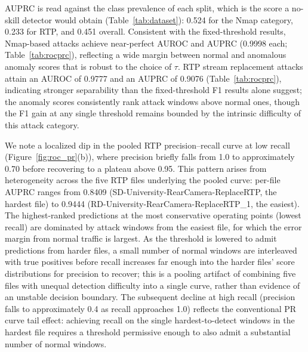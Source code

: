 AUPRC is read against the class prevalence of each split, which is the score a no-skill detector would obtain (Table~\ref{tab:dataset}): 0.524 for the Nmap category, 0.233 for RTP, and 0.451 overall. Consistent with the fixed-threshold results, Nmap-based attacks achieve near-perfect AUROC and AUPRC (0.9998 each; Table~\ref{tab:rocprc}), reflecting a wide margin between normal and anomalous anomaly scores that is robust to the choice of $\tau$. RTP stream replacement attacks attain an AUROC of 0.9777 and an AUPRC of 0.9076 (Table~\ref{tab:rocprc}), indicating stronger separability than the fixed-threshold F1 results alone suggest; the anomaly scores consistently rank attack windows above normal ones, though the F1 gain at any single threshold remains bounded by the intrinsic difficulty of this attack category.

We note a localized dip in the pooled RTP precision--recall curve at low recall (Figure~\ref{fig:roc_pr}(b)), where precision briefly falls from 1.0 to approximately 0.70 before recovering to a plateau above 0.95. This pattern arises from heterogeneity across the five RTP files underlying the pooled curve: per-file AUPRC ranges from 0.8409 (SD-University-RearCamera-ReplaceRTP, the hardest file) to 0.9444 (RD-University-RearCamera-ReplaceRTP\_1, the easiest). The highest-ranked predictions at the most conservative operating points (lowest recall) are dominated by attack windows from the easiest file, for which the error margin from normal traffic is largest. As the threshold is lowered to admit predictions from harder files, a small number of normal windows are interleaved with true positives before recall increases far enough into the harder files' score distributions for precision to recover; this is a pooling artifact of combining five files with unequal detection difficulty into a single curve, rather than evidence of an unstable decision boundary. The subsequent decline at high recall (precision falls to approximately 0.4 as recall approaches 1.0) reflects the conventional PR curve tail effect: achieving recall on the single hardest-to-detect windows in the hardest file requires a threshold permissive enough to also admit a substantial number of normal windows.

